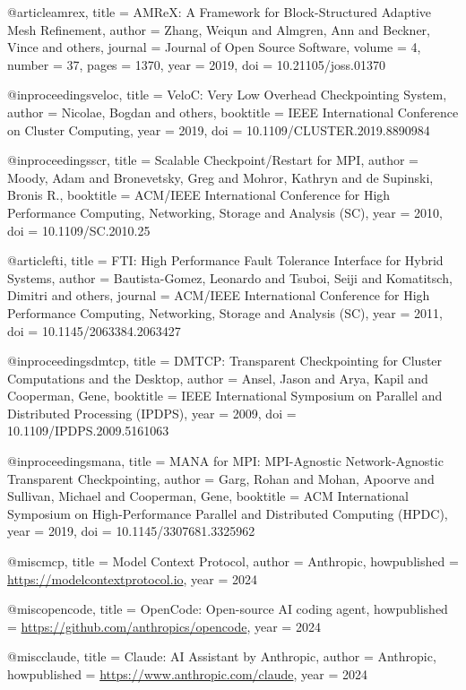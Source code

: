 @article{amrex,
  title = {{AMReX}: A Framework for Block-Structured Adaptive Mesh Refinement},
  author = {Zhang, Weiqun and Almgren, Ann and Beckner, Vince and others},
  journal = {Journal of Open Source Software},
  volume = {4},
  number = {37},
  pages = {1370},
  year = {2019},
  doi = {10.21105/joss.01370}
}

@inproceedings{veloc,
  title = {{VeloC}: Very Low Overhead Checkpointing System},
  author = {Nicolae, Bogdan and others},
  booktitle = {IEEE International Conference on Cluster Computing},
  year = {2019},
  doi = {10.1109/CLUSTER.2019.8890984}
}

@inproceedings{scr,
  title = {Scalable Checkpoint/Restart for {MPI}},
  author = {Moody, Adam and Bronevetsky, Greg and Mohror, Kathryn and de Supinski, Bronis R.},
  booktitle = {ACM/IEEE International Conference for High Performance Computing, Networking, Storage and Analysis (SC)},
  year = {2010},
  doi = {10.1109/SC.2010.25}
}

@article{fti,
  title = {{FTI}: High Performance Fault Tolerance Interface for Hybrid Systems},
  author = {Bautista-Gomez, Leonardo and Tsuboi, Seiji and Komatitsch, Dimitri and others},
  journal = {ACM/IEEE International Conference for High Performance Computing, Networking, Storage and Analysis (SC)},
  year = {2011},
  doi = {10.1145/2063384.2063427}
}

@inproceedings{dmtcp,
  title = {{DMTCP}: Transparent Checkpointing for Cluster Computations and the Desktop},
  author = {Ansel, Jason and Arya, Kapil and Cooperman, Gene},
  booktitle = {IEEE International Symposium on Parallel and Distributed Processing (IPDPS)},
  year = {2009},
  doi = {10.1109/IPDPS.2009.5161063}
}

@inproceedings{mana,
  title = {{MANA} for {MPI}: {MPI}-Agnostic Network-Agnostic Transparent Checkpointing},
  author = {Garg, Rohan and Mohan, Apoorve and Sullivan, Michael and Cooperman, Gene},
  booktitle = {ACM International Symposium on High-Performance Parallel and Distributed Computing (HPDC)},
  year = {2019},
  doi = {10.1145/3307681.3325962}
}

@misc{mcp,
  title = {Model Context Protocol},
  author = {{Anthropic}},
  howpublished = {\url{https://modelcontextprotocol.io}},
  year = {2024}
}

@misc{opencode,
  title = {{OpenCode}: Open-source AI coding agent},
  howpublished = {\url{https://github.com/anthropics/opencode}},
  year = {2024}
}

@misc{claude,
  title = {Claude: {AI} Assistant by {Anthropic}},
  author = {{Anthropic}},
  howpublished = {\url{https://www.anthropic.com/claude}},
  year = {2024}
}

